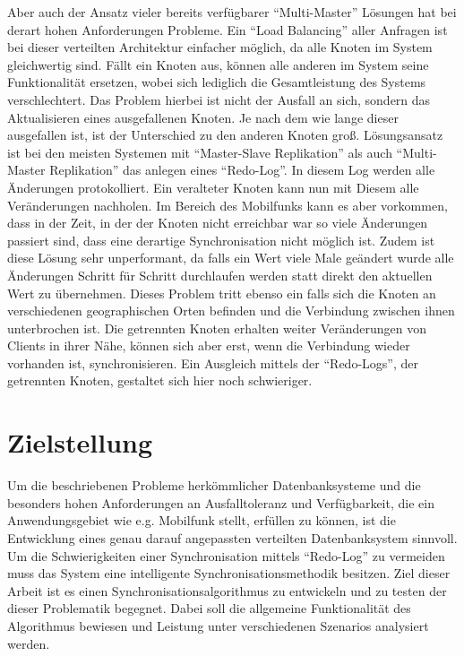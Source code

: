 \documentclass[a4paper,11pt,oneside,%
headsepline,												%
footsepline,												%
bibtotocnumbered									%
]{scrreprt}
\begin{document}
 Aber auch der Ansatz vieler bereits verfügbarer \enquote{Multi-Master} Lösungen hat bei derart hohen Anforderungen Probleme. Ein \enquote{Load Balancing} aller Anfragen ist bei dieser verteilten Architektur einfacher möglich, da alle Knoten im System gleichwertig sind. Fällt ein Knoten aus, können alle anderen im System seine Funktionalität ersetzen, wobei sich lediglich die Gesamtleistung des Systems verschlechtert. Das Problem hierbei ist nicht der Ausfall an sich, sondern das Aktualisieren eines ausgefallenen Knoten. Je nach dem wie lange dieser ausgefallen ist, ist der Unterschied zu den anderen Knoten groß. Lösungsansatz ist bei den meisten Systemen mit \enquote{Master-Slave Replikation} als auch \enquote{Multi-Master Replikation} das anlegen eines \enquote{Redo-Log}. In diesem Log werden alle Änderungen protokolliert. Ein veralteter Knoten kann nun mit Diesem alle Veränderungen nachholen. Im Bereich des Mobilfunks kann es aber vorkommen, dass in der Zeit, in der der Knoten nicht erreichbar war so viele Änderungen passiert sind, dass eine derartige Synchronisation nicht möglich ist. Zudem ist diese Lösung sehr unperformant, da falls ein Wert viele Male geändert wurde alle Änderungen Schritt für Schritt durchlaufen werden statt direkt den aktuellen Wert zu übernehmen. Dieses Problem tritt ebenso ein falls sich die Knoten an verschiedenen geographischen Orten befinden und die Verbindung zwischen ihnen unterbrochen ist. Die getrennten Knoten erhalten weiter Veränderungen von Clients in ihrer Nähe, können sich aber erst, wenn die Verbindung wieder vorhanden ist, synchronisieren. Ein Ausgleich mittels der \enquote{Redo-Logs}, der getrennten Knoten, gestaltet sich hier noch schwieriger.


\section{Zielstellung}
Um die beschriebenen Probleme herkömmlicher Datenbanksysteme und die besonders hohen Anforderungen an Ausfalltoleranz und Verfügbarkeit, die ein Anwendungsgebiet wie e.g. Mobilfunk stellt, erfüllen zu können, ist die Entwicklung eines genau darauf angepassten verteilten Datenbanksystem sinnvoll. Um die Schwierigkeiten einer Synchronisation mittels \enquote{Redo-Log} zu vermeiden muss das System eine intelligente Synchronisationsmethodik besitzen. Ziel dieser Arbeit ist es einen Synchronisationsalgorithmus zu entwickeln und zu testen der dieser Problematik begegnet. Dabei soll die allgemeine Funktionalität des Algorithmus bewiesen und Leistung unter verschiedenen Szenarios analysiert werden.
\end{document}
